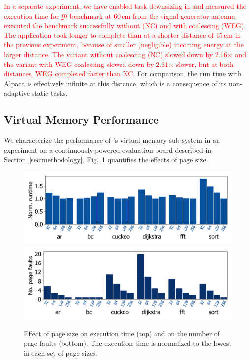 \textcolor{red}{In a separate experiment, we have enabled task downsizing in \sys and measured
the execution time for \textit{fft} benchmark at 60\,cm from the signal
generator antenna. \sys executed the
benchmark successfully without (NC) and with coalescing (WEG). The application
took longer to complete than at a shorter distance of 15\,cm in the previous
experiment, because of smaller (negligible) incoming energy at the larger
distance. The variant without coalescing (NC) slowed down by 2.16$\times$ and the
variant with WEG coalescing slowed down by 2.31$\times$ slower, but at both
distances, WEG completed faster than NC.}
%
For comparison, the run time with Alpaca is effectively infinite at this
distance, which is a consequence of its non-adaptive static tasks.

\subsection{Virtual Memory Performance}
\label{sec:results_memory_management}

We characterize the performance of \sys's virtual memory sub-system in an
experiment on a continuously-powered evaluation board described in
Section~\ref{sec:methodology}.  Fig.~\ref{fig:page_size} quantifies the
effects of page size.
%
\begin{figure}
	\centering
	\includegraphics[width=\columnwidth]{figures/page_exec-time}
	\includegraphics[width=\columnwidth]{figures/pagePulls}
    \caption{Effect of page size on execution time (top) and on the number of
page faults (bottom). The execution time is normalized to the lowest in each set
of page sizes.}
	\label{fig:page_size}
\end{figure}
%
